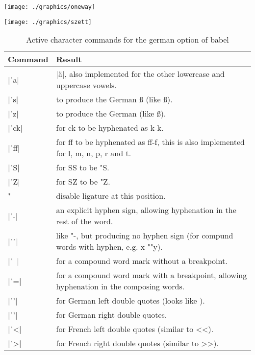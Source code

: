\begin{marginfigure}
\centering
\texttt{[image: ./graphics/oneway]}
\end{marginfigure}

\begin{marginfigure}
\centering
\texttt{[image: ./graphics/szett]}
\end{marginfigure}


\def\textgerman#1{\let\Languagename\languagename%
\gdef\LN{\Languagename}
\selectlanguage{german}#1\expandafter\selectlanguage{english}}
\medskip

\begin{table}[tbp]
\begin{tabular}{lp{7cm}}
\toprule
Command & Result\\
\midrule
|"a| &|\"a|, also implemented for the other lowercase and
uppercase vowels.\\
|"s| &to produce the German \ss{} (like \ss{}).\\
|"z| &to produce the German  (like \ss{}).\\
|"ck| &for ck to be hyphenated as k-k.\\
|"ff| &for ff to be hyphenated as ff-f, this is also implemented
for l, m, n, p, r and t.\\
|"S| &for SS to be \textgerman{\uppercase{"s}}.\\
|"Z| &for SZ to be \uppercase{"z}.\\

\UndefineShortVerb{\|}\DefineShortVerb{\|}" &disable ligature at this position.\\
|"-| &an explicit hyphen sign, allowing hyphenation in the
rest of the word.\\
|""| &like "-, but producing no hyphen sign (for compund
words with hyphen, e.g. x-""y).\\
|"~| &for a compound word mark without a breakpoint.\\
|"=| &for a compound word mark with a breakpoint, allowing
hyphenation in the composing words.\\
|"'| &for German left double quotes (looks like ).\\
|"'| &for German right double quotes.\\
|"<| &for French left double quotes (similar to <<).\\
|">| &for French right double quotes (similar to >>).\\
\bottomrule
\end{tabular}
\caption{Active character commands for the german option of babel}
\end{table}
\medskip


